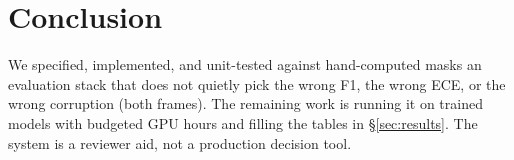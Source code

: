 \section{Conclusion}
\label{sec:conclusion}

We specified, implemented, and unit-tested against hand-computed
masks an evaluation stack that does not quietly pick the wrong F1, the
wrong ECE, or the wrong corruption (both frames). The remaining work
is running it on trained models with budgeted GPU hours and filling
the tables in \S\ref{sec:results}. The system is a reviewer aid, not a
production decision tool.
